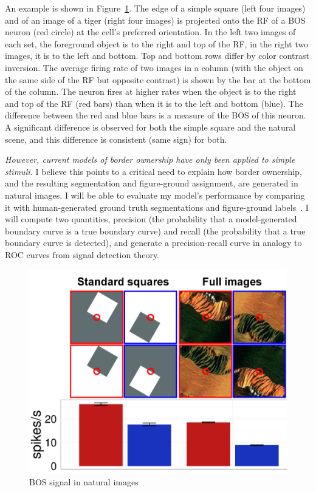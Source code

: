 \documentclass[11pt]{article}
\begin{document}
An example is shown in Figure~\ref{fig:NaturalImages}. The edge of a simple square (left four images) and of
an image of a tiger (right four images) is projected onto the RF of a
BOS neuron (red circle) at the cell's preferred orientation. In the
left two images of each set, the foreground object is to the right and
top of the RF, in the right two images, it is to the left and
bottom. Top and bottom rows differ by color contrast inversion. The
average firing rate of two images in a column (with the object on the
same side of the RF but opposite contrast) is shown by the bar at the
bottom of the column. The neuron fires at higher rates when the object
is to the right and top of the RF (red bars) than when it is to the
left and bottom (blue). The difference between the red and blue bars
is a measure of the BOS of
this neuron. A significant difference is observed for both the simple
square and the natural scene, and this difference is consistent (same
sign) for both.

{\em However, current models of  border ownership
  have only been applied to simple stimuli.}  I believe this points to
a critical need to explain how border ownership, and the resulting
segmentation and figure-ground assignment, are generated in natural
images. I will be able to evaluate my model's performance by comparing
it with human-generated ground truth segmentations and figure-ground
labels~\citep{Martin_etal01}. I will compute two quantities, precision
(the probability that a model-generated boundary curve is a true
boundary curve) and recall (the probability that a true boundary curve
is detected), and generate a precision-recall curve in analogy to ROC
curves from signal detection theory.

\begin{figure}
  \vspace{-30pt}
  \centering 
  \includegraphics[width=.4\textwidth]{figs/bos_naturalimages_clipped}
  \caption{BOS signal in natural images} 
  \vspace{-15pt}
  \label{fig:NaturalImages}
\end{figure}
\end{document}
